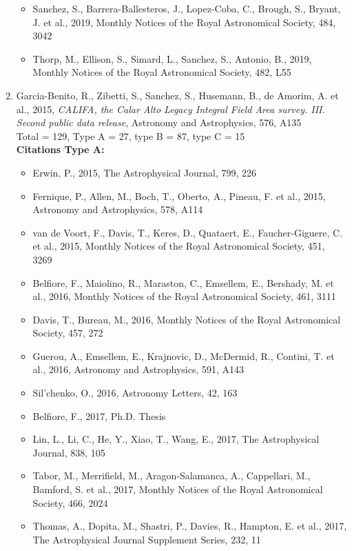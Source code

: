 \documentclass{letter}
\begin{document}
\begin{enumerate}
\begin{itemize}
\item Sanchez, S., Barrera-Ballesteros, J., Lopez-Coba, C., Brough, S., Bryant, J. et al., 2019, Monthly Notices of the Royal Astronomical Society, 484, 3042
\item Thorp, M., Ellison, S., Simard, L., Sanchez, S., Antonio, B., 2019, Monthly Notices of the Royal Astronomical Society, 482, L55
\end{itemize}
\item Garcia-Benito, R., Zibetti, S., Sanchez, S., Husemann, B., de Amorim, A. et al., 2015, {\it CALIFA, the Calar Alto Legacy Integral Field Area survey. III. Second public data release}, Astronomy and Astrophysics, 576, A135 \\ 
Total = 129, Type A = 27, type B = 87, type C = 15 \\ 
{\bf Citations Type A:}
\begin{itemize}
\item Erwin, P., 2015, The Astrophysical Journal, 799, 226
\item Fernique, P., Allen, M., Boch, T., Oberto, A., Pineau, F. et al., 2015, Astronomy and Astrophysics, 578, A114
\item van de Voort, F., Davis, T., Keres, D., Quataert, E., Faucher-Giguere, C. et al., 2015, Monthly Notices of the Royal Astronomical Society, 451, 3269
\item Belfiore, F., Maiolino, R., Maraston, C., Emsellem, E., Bershady, M. et al., 2016, Monthly Notices of the Royal Astronomical Society, 461, 3111
\item Davis, T., Bureau, M., 2016, Monthly Notices of the Royal Astronomical Society, 457, 272
\item Guerou, A., Emsellem, E., Krajnovic, D., McDermid, R., Contini, T. et al., 2016, Astronomy and Astrophysics, 591, A143
\item Sil'chenko, O., 2016, Astronomy Letters, 42, 163
\item Belfiore, F., 2017, Ph.D. Thesis
\item Lin, L., Li, C., He, Y., Xiao, T., Wang, E., 2017, The Astrophysical Journal, 838, 105
\item Tabor, M., Merrifield, M., Aragon-Salamanca, A., Cappellari, M., Bamford, S. et al., 2017, Monthly Notices of the Royal Astronomical Society, 466, 2024
\item Thomas, A., Dopita, M., Shastri, P., Davies, R., Hampton, E. et al., 2017, The Astrophysical Journal Supplement Series, 232, 11

\end{itemize}
\end{enumerate}
\end{document}
